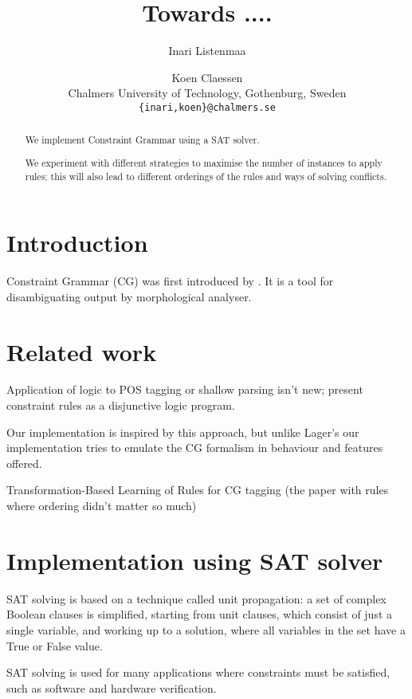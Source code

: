 \documentclass[11pt]{article}
\title{Towards ....}
\author{Inari Listenmaa \and Koen Claessen \\
  Chalmers University of Technology, Gothenburg, Sweden \\
  {\tt \{inari,koen\}@chalmers.se} }
\date{}
\begin{document}
\maketitle
\begin{abstract}
We implement Constraint Grammar using a SAT solver.

We experiment with different strategies to maximise the number of instances to apply rules;
this will also lead to different orderings of the rules and ways of solving conflicts.


\end{abstract}


\section{Introduction}
Constraint Grammar (CG) was first introduced by \cite{KarlssonTODO}. 
It is a tool for disambiguating output by morphological analyser.


\section{Related work}
\label{sect:related}

Application of logic to POS tagging or shallow parsing isn't new;
\cite{lager1998, lager2000} present constraint rules as 
a disjunctive logic program.

Our implementation is inspired by this approach,
but unlike Lager's our implementation tries to emulate the CG
formalism in behaviour and features offered.

Transformation-Based Learning of Rules for CG tagging (the paper with rules where ordering didn't matter so much)



\section{Implementation using SAT solver}
\label{sect:pdf}

SAT solving is based on a technique called unit propagation:
a set of complex Boolean clauses is simplified, starting from unit
clauses, which consist of just a single variable, and working up to a
solution, where all variables in the set have a True or False value.

SAT solving is used for many applications where constraints must be
satisfied, such as software and hardware verification.
\end{document}
